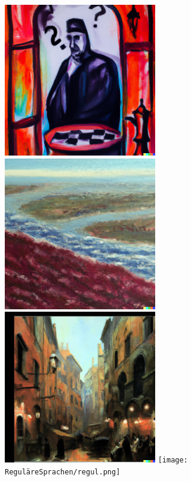 
\includegraphics[width=0.5\textwidth]{Turingmachine/turing.png}
\includegraphics[width=0.5\textwidth]{Berechenbarkeit/predic.png}
\includegraphics[width=0.5\textwidth]{Automaten/finit1.png}
\texttt{[image: ReguläreSprachen/regul.png]}

